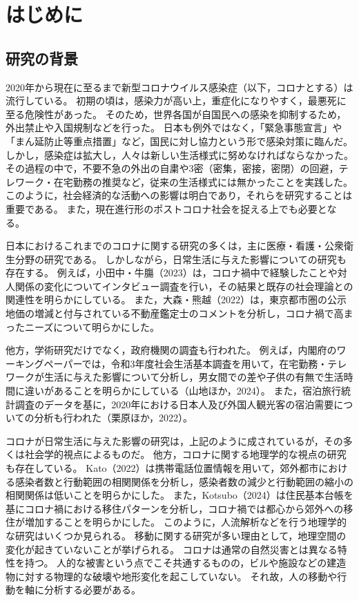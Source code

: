 \documentclass[paper={210mm,297mm},fontsize=15Q,line_length=35zw,number_of_lines=31,head_space=30mm,gutter=40mm,baselineskip=2.0zw,headfoot_verticalposition=1.5zw]{jlreq}
\begin{document}

\section{はじめに}

\subsection{研究の背景}

2020年から現在に至るまで新型コロナウイルス感染症（以下，コロナとする）は流行している。
初期の頃は，感染力が高い上，重症化になりやすく，最悪死に至る危険性があった。
そのため，世界各国が自国民への感染を抑制するため，外出禁止や入国規制などを行った。
日本も例外ではなく，「緊急事態宣言」や「まん延防止等重点措置」など，国民に対し協力という形で感染対策に臨んだ。
しかし，感染症は拡大し，人々は新しい生活様式に努めなければならなかった。
その過程の中で，不要不急の外出の自粛や3密（密集，密接，密閉）の回避，テレワーク・在宅勤務の推奨など，従来の生活様式には無かったことを実践した。
このように，社会経済的な活動への影響は明白であり，それらを研究することは重要である。
また，現在進行形のポストコロナ社会を捉える上でも必要となる。

日本におけるこれまでのコロナに関する研究の多くは，主に医療・看護・公衆衛生分野の研究である。
しかしながら，日常生活に与えた影響についての研究も存在する。
例えば，小田中・牛膓（2023）は，コロナ禍中で経験したことや対人関係の変化についてインタビュー調査を行い，その結果と既存の社会理論との関連性を明らかにしている。
また，大森・熊越（2022）は，東京都市圏の公示地価の増減と付与されている不動産鑑定士のコメントを分析し，コロナ禍で高まったニーズについて明らかにした。

他方，学術研究だけでなく，政府機関の調査も行われた。
例えば，内閣府のワーキングペーパーでは，令和3年度社会生活基本調査を用いて，在宅勤務・テレワークが生活に与えた影響について分析し，男女間での差や子供の有無で生活時間に違いがあることを明らかにしている（山地ほか，2024）。
また，宿泊旅行統計調査のデータを基に，2020年における日本人及び外国人観光客の宿泊需要についての分析も行われた（栗原ほか，2022）。

コロナが日常生活に与えた影響の研究は，上記のように成されているが，その多くは社会学的視点によるものだ。
他方，コロナに関する地理学的な視点の研究も存在している。
Kato（2022）は携帯電話位置情報を用いて，郊外都市における感染者数と行動範囲の相関関係を分析し，感染者数の減少と行動範囲の縮小の相関関係は低いことを明らかにした。
また，Kotsubo（2024）は住民基本台帳を基にコロナ禍における移住パターンを分析し，コロナ禍では都心から郊外への移住が増加することを明らかにした。
このように，人流解析などを行う地理学的な研究はいくつか見られる。
移動に関する研究が多い理由として，地理空間の変化が起きていないことが挙げられる。
コロナは通常の自然災害とは異なる特性を持つ。
人的な被害という点でこそ共通するものの，ビルや施設などの建造物に対する物理的な破壊や地形変化を起こしていない。
それ故，人の移動や行動を軸に分析する必要がある。
\end{document}
